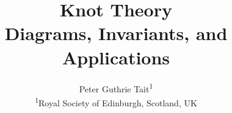 \documentclass[10pt, a4paper, twocolumn]{article}
\begin{document}

\title{{\calligra \Huge Knot Theory}\\
\large Diagrams, Invariants, and Applications}
\author{Peter Guthrie Tait\textsuperscript{1} \\
\normalsize \textsuperscript{1}Royal Society of Edinburgh, Scotland, UK 
}
\date{}
\maketitle








\printbibliography
\end{document}
